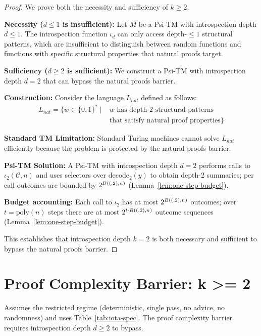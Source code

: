 \begin{proof}
We prove both the necessity and sufficiency of $k \geq 2$.

\textbf{Necessity ($d \le 1$ is insufficient):}
Let $M$ be a Psi-TM with introspection depth $d \leq 1$. The introspection function $\iota_d$ can only access depth-$\leq 1$ structural patterns, which are insufficient to distinguish between random functions and functions with specific structural properties that natural proofs target.

\textbf{Sufficiency ($d \ge 2$ is sufficient):}
We construct a Psi-TM with introspection depth $d = 2$ that can bypass the natural proofs barrier.

\textbf{Construction:}
Consider the language $L_{nat}$ defined as follows:
\begin{align}
L_{nat} = \{w \in \{0,1\}^* \mid &\text{$w$ has depth-2 structural patterns} \nonumber \\
&\text{that satisfy natural proof properties}\}
\end{align}

\textbf{Standard TM Limitation:}
Standard Turing machines cannot solve $L_{nat}$ efficiently because the problem is protected by the natural proofs barrier.

\textbf{Psi-TM Solution:}
A Psi-TM with introspection depth $d = 2$ performs calls to $\iota_2(\mathcal{C},n)$ and uses selectors over $\mathrm{decode}_2(y)$ to obtain depth-2 summaries; per call outcomes are bounded by $2^{B((,2),n)}$ (Lemma~\ref{lem:one-step-budget}).

\textbf{Budget accounting:}
Each call to $\iota_2$ has at most $2^{B((,2),n)}$ outcomes; over $t=\mathrm{poly}(n)$ steps there are at most $2^{t\cdot B((,2),n)}$ outcome sequences (Lemma~\ref{lem:one-step-budget}).

This establishes that introspection depth $k = 2$ is both necessary and sufficient to bypass the natural proofs barrier.
\end{proof}

\section{Proof Complexity Barrier: k >= 2}

\begin{theorem}
Assumes the restricted regime (deterministic, single pass, no advice, no randomness) and uses Table~\ref{tab:iota-spec}.
The proof complexity barrier requires introspection depth $d \geq 2$ to bypass.
\end{theorem}

